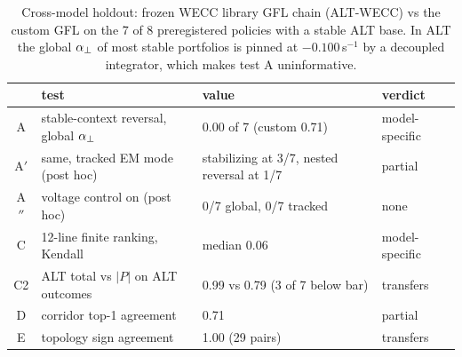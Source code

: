 \begin{table}[!t]
\centering
\caption{Cross-model holdout: frozen WECC library GFL chain (ALT-WECC) vs the custom GFL on the 7 of 8 preregistered policies with a stable ALT base. In ALT the global $\aperp$ of most stable portfolios is pinned at $-0.100$\,s$^{-1}$ by a decoupled integrator, which makes test A uninformative.}\label{tab:cross}
\footnotesize
\setlength{\tabcolsep}{2.5pt}
\begin{tabular}{@{}cL{0.34\columnwidth}L{0.34\columnwidth}L{0.17\columnwidth}@{}}
\toprule
& test & value & verdict \\
\midrule
A & stable-context reversal, global $\aperp$ & 0.00 of 7 (custom 0.71) & model-specific \\
A$'$ & same, tracked EM mode (post hoc) & stabilizing at 3/7, nested reversal at 1/7 & partial \\
A$''$ & voltage control on (post hoc) & 0/7 global, 0/7 tracked & none \\
C & 12-line finite ranking, Kendall & median 0.06 & model-specific \\
C2 & ALT total vs $|P|$ on ALT outcomes & 0.99 vs 0.79 (3 of 7 below bar) & transfers \\
D & corridor top-1 agreement & 0.71 & partial \\
E & topology sign agreement & 1.00 (29 pairs) & transfers \\
\bottomrule
\end{tabular}
\end{table}
